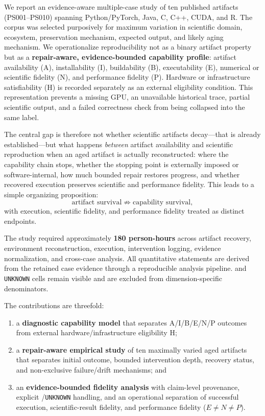 \documentclass[a4paper,fleqn]{cas-dc}
\begin{document}
We report an evidence-aware multiple-case study of ten published artifacts (PS001--PS010) spanning Python/PyTorch, Java, C, C++, CUDA, and R. The corpus was selected purposively for maximum variation in scientific domain, ecosystem, preservation mechanism, expected output, and likely aging mechanism. We operationalize reproducibility not as a binary artifact property but as a \textbf{repair-aware, evidence-bounded capability profile}: artifact availability (A), installability (I), buildability (B), executability (E), numerical or scientific fidelity (N), and performance fidelity (P). Hardware or infrastructure satisfiability (H) is recorded separately as an external eligibility condition. This representation prevents a missing GPU, an unavailable historical trace, partial scientific output, and a failed correctness check from being collapsed into the same label.

The central gap is therefore not whether scientific artifacts decay---that is already established---but what happens \emph{between} artifact availability and scientific reproduction when an aged artifact is actually reconstructed: where the capability chain stops, whether the stopping point is externally imposed or software-internal, how much bounded repair restores progress, and whether recovered execution preserves scientific and performance fidelity. This leads to a simple organizing proposition:
\[
\text{artifact survival}\not\Rightarrow\text{capability survival},
\]
with execution, scientific fidelity, and performance fidelity treated as distinct endpoints.

The study required approximately \textbf{180 person-hours} across artifact recovery, environment reconstruction, execution, intervention logging, evidence normalization, and cross-case analysis. All quantitative statements are derived from the retained case evidence through a reproducible analysis pipeline. \protect{} and \texttt{UNKNOWN} cells remain visible and are excluded from dimension-specific denominators.

The contributions are threefold:
\begin{enumerate}
\item a \textbf{diagnostic capability model} that separates A/I/B/E/N/P outcomes from external hardware/infrastructure eligibility H;
\item a \textbf{repair-aware empirical study} of ten maximally varied aged artifacts that separates initial outcome, bounded intervention depth, recovery status, and non-exclusive failure/drift mechanisms; and
\item an \textbf{evidence-bounded fidelity analysis} with claim-level provenance, explicit \protect{}/\texttt{UNKNOWN} handling, and an operational separation of successful execution, scientific-result fidelity, and performance fidelity (\(E\neq N\neq P\)).
\end{enumerate}
\end{document}
